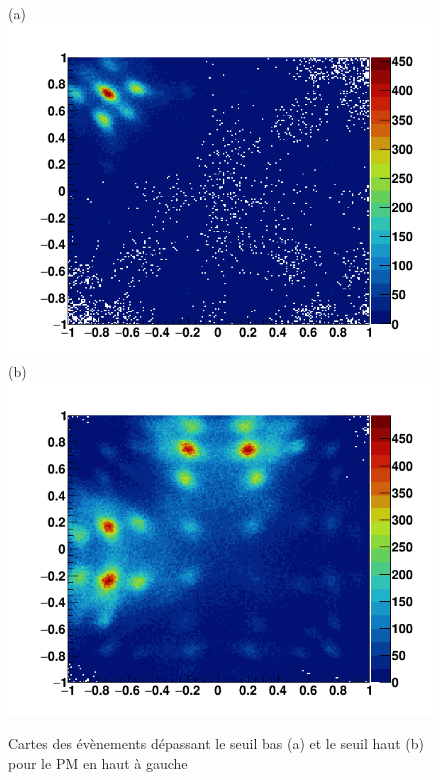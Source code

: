 \documentclass[11pt,a4paper,oldfontcommands]{memoir}
\begin{document}
\begin{figure}[h!]
\centering
\subfloat(a){\includegraphics[scale=0.3]{Bloc/low.png}}
\subfloat(b){\includegraphics[scale=0.3]{Bloc/High.png}}
\caption{Cartes des évènements dépassant le seuil bas (a) et le seuil haut (b) pour le PM en haut à gauche}
\label{Thresh}
\end{figure}
\end{document}
